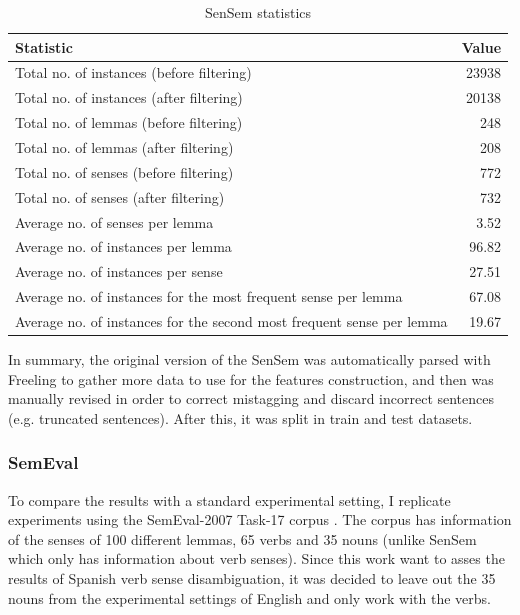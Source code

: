 \begin{table}[ht]
  \centering
  \begin{tabular}{lr}
    \toprule
    \textbf{Statistic} & \textbf{Value} \\
    \midrule
    Total no. of instances (before filtering) & 23938 \\
    Total no. of instances (after filtering) & 20138 \\
    Total no. of lemmas (before filtering) & 248 \\
    Total no. of lemmas (after filtering) & 208 \\
    Total no. of senses (before filtering) & 772 \\
    Total no. of senses (after filtering) & 732 \\
    \midrule
    Average no. of senses per lemma & 3.52 \\
    Average no. of instances per lemma & 96.82 \\
    Average no. of instances per sense & 27.51 \\
    Average no. of instances for the most frequent sense per lemma & 67.08 \\
    Average no. of instances for the second most frequent sense per lemma & 19.67 \\
    \bottomrule
  \end{tabular}
  \caption{SenSem statistics}
  \label{tab:sensem:stats}
\end{table}

In summary, the original version of the SenSem was automatically parsed with
Freeling to gather more data to use for the features construction, and then was
manually revised in order to correct mistagging and discard incorrect sentences
(e.g. truncated sentences). After this, it was split in train and test
datasets.

\subsubsection{SemEval}

To compare the results with a standard experimental setting, I replicate
experiments using the SemEval-2007 Task-17 corpus
\cite{Pradhan:2007:STE:1621474.1621490}. The corpus has information of the
senses of 100 different lemmas, 65 verbs and 35 nouns (unlike SenSem which only
has information about verb senses). Since this work want to asses the results
of Spanish verb sense disambiguation, it was decided to leave out the 35 nouns
from the experimental settings of English and only work with the verbs.


